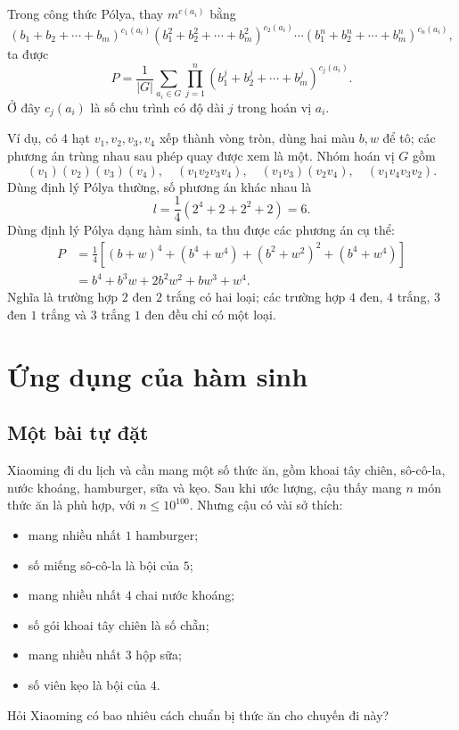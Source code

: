 \documentclass[11pt]{article}
\begin{document}
Trong công thức Pólya, thay \(m^{c(a_i)}\) bằng
\[
  (b_1+b_2+\cdots+b_m)^{c_1(a_i)}
  (b_1^2+b_2^2+\cdots+b_m^2)^{c_2(a_i)}
  \cdots
  (b_1^n+b_2^n+\cdots+b_m^n)^{c_n(a_i)},
\]
ta được
\[
  P=\frac1{|G|}\sum_{a_i\in G}
  \prod_{j=1}^n
  (b_1^j+b_2^j+\cdots+b_m^j)^{c_j(a_i)}.
\]
Ở đây \(c_j(a_i)\) là số chu trình có độ dài \(j\) trong hoán vị \(a_i\).

Ví dụ, có \(4\) hạt \(v_1,v_2,v_3,v_4\) xếp thành vòng tròn, dùng hai màu
\(b,w\) để tô; các phương án trùng nhau sau phép quay được xem là một. Nhóm
hoán vị \(G\) gồm
\[
  (v_1)(v_2)(v_3)(v_4),\quad
  (v_1v_2v_3v_4),\quad
  (v_1v_3)(v_2v_4),\quad
  (v_1v_4v_3v_2).
\]
Dùng định lý Pólya thường, số phương án khác nhau là
\[
  l=\frac14(2^4+2+2^2+2)=6.
\]
Dùng định lý Pólya dạng hàm sinh, ta thu được các phương án cụ thể:
\[
\begin{aligned}
  P
  &=\frac14\left[(b+w)^4+(b^4+w^4)+(b^2+w^2)^2+(b^4+w^4)\right]\\
  &=b^4+b^3w+2b^2w^2+bw^3+w^4.
\end{aligned}
\]
Nghĩa là trường hợp \(2\) đen \(2\) trắng có hai loại; các trường hợp
\(4\) đen, \(4\) trắng, \(3\) đen \(1\) trắng và \(3\) trắng \(1\) đen đều
chỉ có một loại.

\section{Ứng dụng của hàm sinh}

\subsection{Một bài tự đặt}

Xiaoming đi du lịch và cần mang một số thức ăn, gồm khoai tây chiên, sô-cô-la,
nước khoáng, hamburger, sữa và kẹo. Sau khi ước lượng, cậu thấy mang
\(n\) món thức ăn là phù hợp, với \(n\le 10^{100}\). Nhưng cậu có vài sở
thích:
\begin{itemize}
  \item mang nhiều nhất \(1\) hamburger;
  \item số miếng sô-cô-la là bội của \(5\);
  \item mang nhiều nhất \(4\) chai nước khoáng;
  \item số gói khoai tây chiên là số chẵn;
  \item mang nhiều nhất \(3\) hộp sữa;
  \item số viên kẹo là bội của \(4\).
\end{itemize}
Hỏi Xiaoming có bao nhiêu cách chuẩn bị thức ăn cho chuyến đi này?
\end{document}
